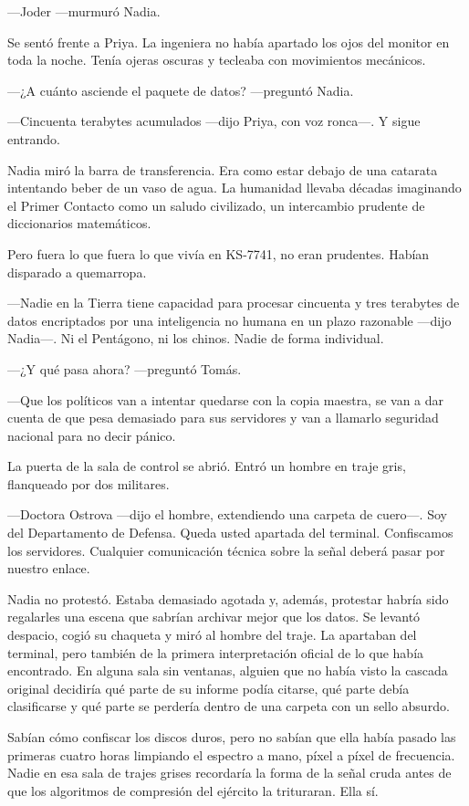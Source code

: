 \documentclass[11pt,a5paper,twoside]{book}
\begin{document}
—Joder —murmuró Nadia.

Se sentó frente a Priya. La ingeniera no había apartado los ojos del monitor en toda la noche. Tenía ojeras oscuras y tecleaba con movimientos mecánicos.

—¿A cuánto asciende el paquete de datos? —preguntó Nadia.

—Cincuenta terabytes acumulados —dijo Priya, con voz ronca—. Y sigue entrando.

Nadia miró la barra de transferencia. Era como estar debajo de una catarata intentando beber de un vaso de agua. La humanidad llevaba décadas imaginando el Primer Contacto como un saludo civilizado, un intercambio prudente de diccionarios matemáticos.

Pero fuera lo que fuera lo que vivía en KS-7741, no eran prudentes. Habían disparado a quemarropa.

—Nadie en la Tierra tiene capacidad para procesar cincuenta y tres terabytes de datos encriptados por una inteligencia no humana en un plazo razonable —dijo Nadia—. Ni el Pentágono, ni los chinos. Nadie de forma individual.

—¿Y qué pasa ahora? —preguntó Tomás.

—Que los políticos van a intentar quedarse con la copia maestra, se van a dar cuenta de que pesa demasiado para sus servidores y van a llamarlo seguridad nacional para no decir pánico.

La puerta de la sala de control se abrió. Entró un hombre en traje gris, flanqueado por dos militares.

—Doctora Ostrova —dijo el hombre, extendiendo una carpeta de cuero—. Soy del Departamento de Defensa. Queda usted apartada del terminal. Confiscamos los servidores. Cualquier comunicación técnica sobre la señal deberá pasar por nuestro enlace.

Nadia no protestó. Estaba demasiado agotada y, además, protestar habría sido regalarles una escena que sabrían archivar mejor que los datos. Se levantó despacio, cogió su chaqueta y miró al hombre del traje. La apartaban del terminal, pero también de la primera interpretación oficial de lo que había encontrado. En alguna sala sin ventanas, alguien que no había visto la cascada original decidiría qué parte de su informe podía citarse, qué parte debía clasificarse y qué parte se perdería dentro de una carpeta con un sello absurdo.

Sabían cómo confiscar los discos duros, pero no sabían que ella había pasado las primeras cuatro horas limpiando el espectro a mano, píxel a píxel de frecuencia. Nadie en esa sala de trajes grises recordaría la forma de la señal cruda antes de que los algoritmos de compresión del ejército la trituraran. Ella sí.
\end{document}
